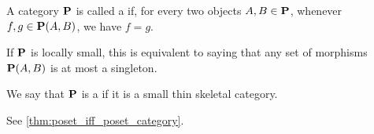 \begin{definition}\label{def:thin_category}\cite{nLab:thin_category}
  A category \( \operatorname{\mathbf{P}} \) is called a  if, for every two objects \( A, B \in \operatorname{\mathbf{P}} \), whenever \( f, g \in \operatorname{\mathbf{P}}(A, B) \), we have \( f = g \).

  If \( \operatorname{\mathbf{P}} \) is locally small, this is equivalent to saying that any set of morphisms \( \operatorname{\mathbf{P}}(A, B) \) is at most a singleton.
\end{definition}

\begin{definition}\label{def:poset_category}
  We say that \( \operatorname{\mathbf{P}} \) is a  if it is a small thin skeletal category.

  See \cref{thm:poset_iff_poset_category}.
\end{definition}

